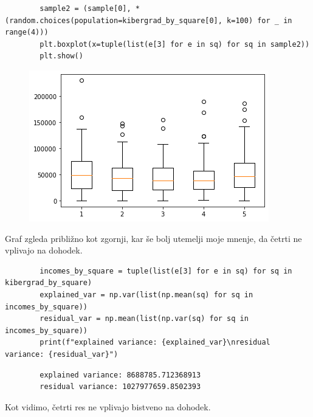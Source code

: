 \documentclass[a4paper]{article}
\begin{document}
\begin{homeworkProblem}
    \pagebreak
    \solution
    \begin{verbatim}
        sample2 = (sample[0], *(random.choices(population=kibergrad_by_square[0], k=100) for _ in range(4)))
        plt.boxplot(x=tuple(list(e[3] for e in sq) for sq in sample2))
        plt.show()
    \end{verbatim}
    \begin{figure}[h!]
        \includegraphics{fig-1-2.png}
    \end{figure}

    Graf zgleda približno kot zgornji, kar še bolj utemelji moje mnenje, da četrti ne vplivajo na dohodek.

    \solution
    \begin{verbatim}
        incomes_by_square = tuple(list(e[3] for e in sq) for sq in kibergrad_by_square)
        explained_var = np.var(list(np.mean(sq) for sq in incomes_by_square))
        residual_var = np.mean(list(np.var(sq) for sq in incomes_by_square))
        print(f"explained variance: {explained_var}\nresidual variance: {residual_var}")
    \end{verbatim}
    \begin{verbatim}
        explained variance: 8688785.712368913
        residual variance: 1027977659.8502393
    \end{verbatim}
    Kot vidimo, četrti res ne vplivajo bistveno na dohodek.

\end{homeworkProblem}

\newpage
\end{document}
